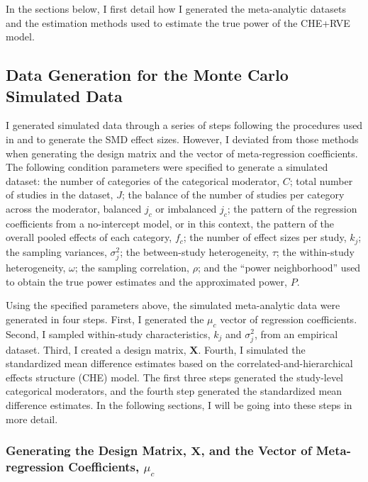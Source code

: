 In the sections below, I first detail how I generated the meta-analytic datasets and the estimation methods used to estimate the true power of the CHE+RVE model. 


\subsection{Data Generation for the Monte Carlo Simulated Data}

I generated simulated data through a series of steps following the procedures used in \textcite{vembye2023} and \textcite{pustejovsky2022} to generate the SMD effect sizes. However, I deviated from those methods when generating the design matrix and the vector of meta-regression coefficients. The following condition parameters were specified to generate a simulated dataset: the number of categories of the categorical moderator, $C$; total number of studies in the dataset, $J$; the balance of the number of studies per category across the moderator, balanced $j_c$ or imbalanced $j_c$; the pattern of the regression coefficients from a no-intercept model, or in this context, the pattern of the overall pooled effects of each category, $f_c$; the number of effect sizes per study, $k_j$; the sampling variances, $\sigma_j^2$; the between-study heterogeneity, $\tau$; the within-study heterogeneity, $\omega$; the sampling correlation, $\rho$; and the ``power neighborhood'' used to obtain the true power estimates and the approximated power, $P$. 

Using the specified parameters above, the simulated meta-analytic data were generated in four steps. First, I generated the $\mu_c$ vector of regression coefficients. Second, I sampled within-study characteristics, $k_j$ and $\sigma_j^2$, from an empirical dataset. Third, I created a design matrix, $\bm{X}$. Fourth, I simulated the standardized mean difference estimates based on the correlated-and-hierarchical effects structure (CHE) model. The first three steps generated the study-level categorical moderators, and the fourth step generated the standardized mean difference estimates. In the following sections, I will be going into these steps in more detail.

\subsubsection{Generating the Design Matrix, $\bm{X}$, and the Vector of Meta-regression Coefficients, $\mu_c$} \label{sec:XandBeta}

